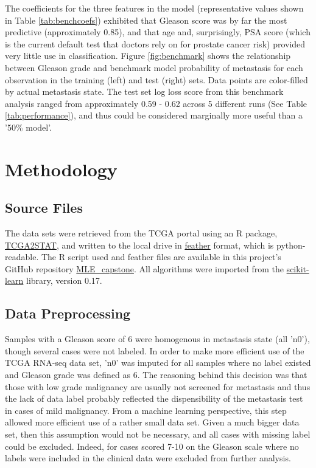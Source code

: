 \documentclass[final]{article}
\begin{document}
The coefficients for the three features in the model (representative values shown in Table \ref{tab:benchcoefs}) exhibited that
Gleason score was by far the most predictive (approximately 0.85), and that age and, surprisingly,
PSA score (which is the current default test that doctors rely on
for prostate cancer risk)  provided very little use in classification.  Figure \ref{fig:benchmark}
shows the relationship between Gleason grade and benchmark model probability of
metastasis for each observation in the training (left) and test (right) sets.  Data points
are color-filled by actual metastasis state.  The test set log loss score from this benchmark analysis ranged from approximately 0.59 - 0.62 across 5 different runs (See Table \ref{tab:performance}), and
thus could be considered marginally more useful than a '50\% model'.


\section{Methodology}

\subsection{Source Files}

The data sets were retrieved from the TCGA portal using an R package,
\href{https://cran.r-project.org/web/packages/TCGA2STAT/index.html}{TCGA2STAT},
and written to the local drive in \href{https://github.com/wesm/feather}{feather} format,
which is python-readable.  The R script used and feather files are
available in this project's GitHub repository
\href{https://github.com/CCThompson82/MLE\_capstone}{MLE\_capstone}.  All
algorithms were imported from the
\href{http://scikit-learn.org/stable/}{scikit-learn} library, version 0.17.

\subsection{Data Preprocessing}

Samples with a Gleason score of 6 were homogenous in metastasis state (all
'n0'), though several cases were not labeled.  In order to make more efficient use
of the  TCGA RNA-seq data set, 'n0' was imputed for all samples where no label
existed and  Gleason grade was defined as 6.  The reasoning behind this decision
was that those with low grade malignancy are usually not screened for
metastasis and thus the lack of data label probably reflected the
dispensibility of the metastasis test in cases of mild malignancy. From a
machine learning perspective, this step allowed more efficient use of a rather
small data set.  Given a much bigger data set, then this assumption would not be
necessary, and  all cases with missing label could be excluded.  Indeed, for
cases scored 7-10 on the Gleason scale where no labels were included in the
clinical data were excluded from further analysis.
\end{document}
